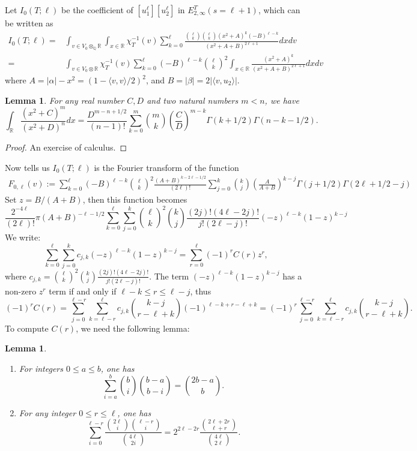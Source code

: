 \documentclass[12pt]{article}
\newtheorem{lemma}[thm]{Lemma}
\theoremstyle{remark}
\theoremstyle{definition}
\newcommand{\Q}{\mathbb{Q}}
\newcommand{\R}{\mathbb{R}}
\newcommand{\lrangle}[2]{\langle #1,#2\rangle}
\begin{document}
Let $I_{0}(T;\ell)$ be the coefficient of $[u_{1}^{\ell}][u_{2}^{\ell}]$ in $E_{2,\infty}^{T}(s=\ell+1)$,
which can be written as 
\begin{align*}
    I_{0}(T;\ell)=&\int_{v\in V_{0}\otimes_{\Q}\R}\int_{x\in \R}\chi_{T}^{-1}(v)\sum_{k=0}^{\ell}\frac{{\ell \choose k}{\ell\choose k}(x^{2}+A)^{k}(-B)^{\ell-k}}{(x^{2}+A+B)^{2\ell+1}}dxdv\\
    =&\int_{v\in V_{0}\otimes \R}\chi_{T}^{-1}(v)\sum_{k=0}^{\ell}(-B)^{\ell-k}{\ell\choose k}^{2}\int_{x\in \R}\frac{(x^{2}+A)^{k}}{(x^{2}+A+B)^{2\ell+1}}dxdv
\end{align*}
where $A=|\alpha|-x^{2}=\left(1-\lrangle{v}{v}/2\right)^{2}$, and $B=|\beta|=2|\lrangle{v}{u_{2}}|$.
\begin{lemma}
    \label{lemma integral over center of Heisenberg}
    For any real number $C,D$
    and two natural numbers $m<n$,
    we have 
    \[\int_{\R}\frac{(x^{2}+C)^{m}}{(x^{2}+D)^{n}}dx=\frac{D^{m-n+1/2}}{(n-1)!}\sum_{k=0}^{m}{m\choose k}\left(\frac{C}{D}\right)^{m-k}\Gamma(k+1/2)\Gamma(n-k-1/2).\]
\end{lemma}
\begin{proof}
    An exercise of calculus.
\end{proof}
Now  tells us $I_{0}(T;\ell)$ is the Fourier transform of the function 
\begin{align*}
    F_{0,\ell}(v):=\sum_{k=0}^{\ell}(-B)^{\ell-k}{\ell\choose k}^{2}\frac{(A+B)^{k-2\ell-1/2}}{(2\ell)!}\sum_{j=0}^{k}{k\choose j}\left(\frac{A}{A+B}\right)^{k-j}\Gamma(j+1/2)\Gamma(2\ell+1/2-j)
\end{align*}
Set $z=B/(A+B)$,
then this function becomes 
\[\frac{2^{-4\ell}}{(2\ell)!}\pi(A+B)^{-\ell-1/2}\sum_{k=0}^{\ell}\sum_{j=0}^{k}{\ell\choose k}^{2}{k\choose j}\frac{(2j)!(4\ell-2j)!}{j!(2\ell-j)!}(-z)^{\ell-k}(1-z)^{k-j}\]
We write:
\[\sum_{k=0}^{\ell}\sum_{j=0}^{k}c_{j,k}(-z)^{\ell-k}(1-z)^{k-j}=\sum_{r=0}^{\ell}(-1)^{r}C(r)z^{r},\]
where $c_{j,k}={\ell\choose k}^{2}{k\choose j}\frac{(2j)!(4\ell-2j)!}{j!(2\ell-j)!}$.
The term $(-z)^{\ell-k}(1-z)^{k-j}$ has a non-zero $z^{r}$ term if and only if 
$\ell-k\leq r\leq \ell-j$,
thus 
\[(-1)^{r}C(r)=\sum_{j=0}^{\ell-r}\sum_{k=\ell-r}^{\ell}c_{j,k}{{k-j}\choose {r-\ell+k}}(-1)^{\ell-k+r-\ell+k}=(-1)^{r}\sum_{j=0}^{\ell-r}\sum_{k=\ell-r}^{\ell}c_{j,k}{{k-j}\choose {r-\ell+k}}.\]
To compute $C(r)$,
we need the following lemma:
\begin{lemma}
    \label{lemma combinatorics summations}
    \begin{enumerate}
        \item For integers $0\leq a\leq b$, one has \[\sum_{i=a}^{b}{b\choose i}{{b-a}\choose{b-i}}={{2b-a}\choose b}.\]
        \item For any integer $0\leq r\leq \ell$, one has 
        \[\sum_{i=0}^{\ell-r}\frac{\binom{2\ell}{i}\binom{\ell-r}{i}}{\binom{4\ell}{2i}}=2^{2\ell-2r}\frac{\binom{2\ell+2r}{\ell+r}}{\binom{4\ell}{2\ell}}.\]
    \end{enumerate}
\end{lemma}
\end{document}
